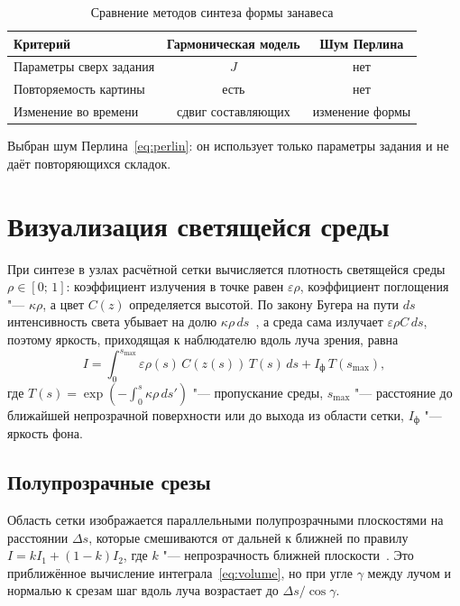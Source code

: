 \begin{table}[!ht]
	\caption{Сравнение методов синтеза формы занавеса}
	\label{tab:synthesis}
	\begin{tabular}{|L{0.44}|C{0.27}|C{0.27}|}
		\hline
		Критерий & Гармоническая модель & Шум Перлина \\
		\hline
		Параметры сверх задания & $J$ & нет \\
		\hline
		Повторяемость картины & есть & нет \\
		\hline
		Изменение во времени & сдвиг составляющих & изменение формы \\
		\hline
	\end{tabular}
\end{table}

Выбран шум Перлина~\eqref{eq:perlin}: он использует только параметры задания и не даёт повторяющихся складок.

\section{Визуализация светящейся среды}

При синтезе в узлах расчётной сетки вычисляется плотность светящейся среды $\rho \in [0;\, 1]$: коэффициент излучения в точке равен $\varepsilon \rho$, коэффициент поглощения "--- $\kappa \rho$, а цвет $C(z)$ определяется высотой. По закону Бугера на пути $ds$ интенсивность света убывает на долю $\kappa \rho\, ds$~\cite{landsberg2003}, а среда сама излучает $\varepsilon \rho C\, ds$, поэтому яркость, приходящая к наблюдателю вдоль луча зрения, равна
\begin{equation}
	I = \int_0^{s_{\max}} \varepsilon \rho(s)\, C(z(s))\, T(s)\, ds + I_{\text{ф}}\, T(s_{\max}),
	\label{eq:volume}
\end{equation}
где $T(s) = \exp\left( -\int_0^{s} \kappa \rho\, ds' \right)$ "--- пропускание среды, $s_{\max}$ "--- расстояние до ближайшей непрозрачной поверхности или до выхода из области сетки, $I_{\text{ф}}$ "--- яркость фона.

\subsection{Полупрозрачные срезы}

Область сетки изображается параллельными полупрозрачными плоскостями на расстоянии $\Delta s$, которые смешиваются от дальней к ближней по правилу $I = k I_1 + (1 - k) I_2$, где $k$ "--- непрозрачность ближней плоскости~\cite[с.~413]{rogers1989}. Это приближённое вычисление интеграла~\eqref{eq:volume}, но при угле $\gamma$ между лучом и нормалью к срезам шаг вдоль луча возрастает до $\Delta s / \cos\gamma$.

